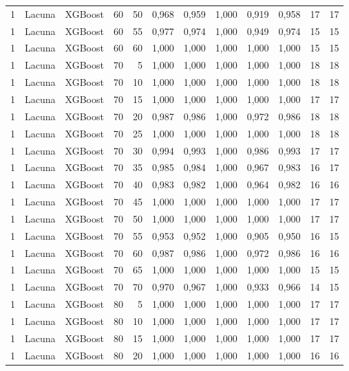 \begin{longtable}{@{}rllrrrrrrrrr@{}}
1 & Lacuna & XGBoost & 60 & 50 & 0,968 & 0,959 & 1,000 & 0,919 & 0,958 & 17 & 17 \\
1 & Lacuna & XGBoost & 60 & 55 & 0,977 & 0,974 & 1,000 & 0,949 & 0,974 & 15 & 15 \\
1 & Lacuna & XGBoost & 60 & 60 & 1,000 & 1,000 & 1,000 & 1,000 & 1,000 & 15 & 15 \\
1 & Lacuna & XGBoost & 70 & 5 & 1,000 & 1,000 & 1,000 & 1,000 & 1,000 & 18 & 18 \\
1 & Lacuna & XGBoost & 70 & 10 & 1,000 & 1,000 & 1,000 & 1,000 & 1,000 & 18 & 18 \\
1 & Lacuna & XGBoost & 70 & 15 & 1,000 & 1,000 & 1,000 & 1,000 & 1,000 & 17 & 17 \\
1 & Lacuna & XGBoost & 70 & 20 & 0,987 & 0,986 & 1,000 & 0,972 & 0,986 & 18 & 18 \\
1 & Lacuna & XGBoost & 70 & 25 & 1,000 & 1,000 & 1,000 & 1,000 & 1,000 & 18 & 18 \\
1 & Lacuna & XGBoost & 70 & 30 & 0,994 & 0,993 & 1,000 & 0,986 & 0,993 & 17 & 17 \\
1 & Lacuna & XGBoost & 70 & 35 & 0,985 & 0,984 & 1,000 & 0,967 & 0,983 & 16 & 17 \\
1 & Lacuna & XGBoost & 70 & 40 & 0,983 & 0,982 & 1,000 & 0,964 & 0,982 & 16 & 16 \\
1 & Lacuna & XGBoost & 70 & 45 & 1,000 & 1,000 & 1,000 & 1,000 & 1,000 & 17 & 17 \\
1 & Lacuna & XGBoost & 70 & 50 & 1,000 & 1,000 & 1,000 & 1,000 & 1,000 & 17 & 17 \\
1 & Lacuna & XGBoost & 70 & 55 & 0,953 & 0,952 & 1,000 & 0,905 & 0,950 & 16 & 15 \\
1 & Lacuna & XGBoost & 70 & 60 & 0,987 & 0,986 & 1,000 & 0,972 & 0,986 & 16 & 16 \\
1 & Lacuna & XGBoost & 70 & 65 & 1,000 & 1,000 & 1,000 & 1,000 & 1,000 & 15 & 15 \\
1 & Lacuna & XGBoost & 70 & 70 & 0,970 & 0,967 & 1,000 & 0,933 & 0,966 & 14 & 15 \\
1 & Lacuna & XGBoost & 80 & 5 & 1,000 & 1,000 & 1,000 & 1,000 & 1,000 & 17 & 17 \\
1 & Lacuna & XGBoost & 80 & 10 & 1,000 & 1,000 & 1,000 & 1,000 & 1,000 & 17 & 17 \\
1 & Lacuna & XGBoost & 80 & 15 & 1,000 & 1,000 & 1,000 & 1,000 & 1,000 & 17 & 17 \\
1 & Lacuna & XGBoost & 80 & 20 & 1,000 & 1,000 & 1,000 & 1,000 & 1,000 & 16 & 16 \\

\end{longtable}
